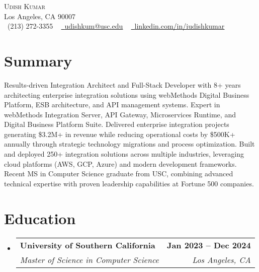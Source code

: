 \documentclass[letterpaper,10pt]{article}
\makeatletter
\newcommand{\resumeSubheading}[4]{
  \vspace{-2pt}\item
    \begin{tabular*}{1.0\textwidth}[t]{l@{\extracolsep{\fill}}r}
      \textbf{#1} & \textbf{\small #2} \\
      \textit{\small#3} & \textit{\small #4} \\
    \end{tabular*}\vspace{-7pt}
}
\newcommand{\resumeSubHeadingListStart}{\begin{itemize}[leftmargin=0.15in, label={}]}
\newcommand{\resumeSubHeadingListEnd}{\end{itemize}}
\makeatother
\begin{document}
\begin{center}
    {\Huge \scshape Udish Kumar} \\ \vspace{1pt}
    Los Angeles, CA 90007 \\ \vspace{1pt}
    \small \raisebox{-0.1\height}\faPhone\ (213) 272-3355 ~ \href{mailto:udishkum@usc.edu}{\raisebox{-0.2\height}\faEnvelope\  \underline{udishkum@usc.edu}} ~ 
    \href{https://linkedin.com/in/iudishkumar/}{\raisebox{-0.2\height}\faLinkedin\ \underline{linkedin.com/in/iudishkumar}}
    \vspace{-8pt}
\end{center}
\vspace{-10pt}

\section{Summary}
Results-driven Integration Architect and Full-Stack Developer with 8+ years architecting enterprise integration solutions using webMethods Digital Business Platform, ESB architecture, and API management systems. Expert in webMethods Integration Server, API Gateway, Microservices Runtime, and Digital Business Platform Suite. Delivered enterprise integration projects generating \$3.2M+ in revenue while reducing operational costs by \$500K+ annually through strategic technology migrations and process optimization. Built and deployed 250+ integration solutions across multiple industries, leveraging cloud platforms (AWS, GCP, Azure) and modern development frameworks. Recent MS in Computer Science graduate from USC, combining advanced technical expertise with proven leadership capabilities at Fortune 500 companies.
\vspace{-10pt}

\section{Education}
\resumeSubHeadingListStart
  \resumeSubheading
    {University of Southern California}{Jan 2023 -- Dec 2024}
    {Master of Science in Computer Science}{Los Angeles, CA}
\resumeSubHeadingListEnd
\vspace{-11pt}

\end{document}
